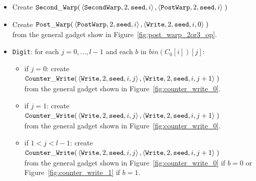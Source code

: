 \begin{itemize}
    \item Create
    $\begin{aligned}[t]
        {\tt Second\_Warp}(&\left\langle {\tt SecondWarp}, 2, {\tt seed}, i \right\rangle,
                     \left\langle {\tt PostWarp},   2, {\tt seed}, i \right\rangle \;)
    \end{aligned}$

    \item Create
    $\begin{aligned}[t]
        {\tt Post\_Warp}(&\left\langle {\tt PostWarp}, 2, {\tt seed}, i    \right\rangle,
                   \left\langle {\tt Write},    2, {\tt seed}, i, 0 \right\rangle \;)
    \end{aligned}$\\ from the general gadget show in Figure~\ref{fig:post_warp_2or3_op}.

    \item {\tt Digit}: for each $j=0,\ldots,l-1$ and each $b$ in $bin(C_0[i])[j]$:
    \begin{itemize}
        \item if $j = 0$: create
        $\begin{aligned}[t]
            {\tt Counter\_Write}(&\left\langle {\tt Write}, 2, {\tt seed}, i, j \right\rangle, \left\langle {\tt Write}, 2, {\tt seed}, i, j + 1 \right\rangle \;)
        \end{aligned}$\\from the general gadget shown in Figure~\ref{fig:counter_write_0}.

        \item if $j = 1$: create
        $\begin{aligned}[t]
            {\tt Counter\_Write}(&\left\langle {\tt Write}, 2, {\tt seed}, i, j \right\rangle, \left\langle {\tt Write}, 2, {\tt seed}, i, j + 1 \right\rangle \;)
        \end{aligned}$\\from the general gadget shown in Figure~\ref{fig:counter_write_0}.

        \item if $1 < j < l-1$: create
        $\begin{aligned}[t]
            {\tt Counter\_Write}(&\left\langle {\tt Write}, 2, {\tt seed}, i, j \right\rangle, \left\langle {\tt Write}, 2, {\tt seed}, i, j + 1 \right\rangle \;)
        \end{aligned}$\\from the general gadget shown in Figure~\ref{fig:counter_write_0} if $b = 0$ or Figure~\ref{fig:counter_write_1} if $b = 1$.


\end{itemize}
\end{itemize}

